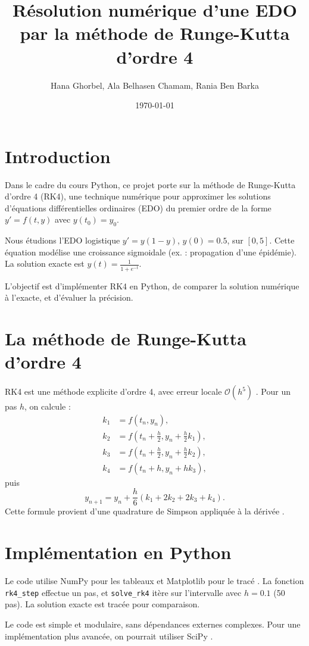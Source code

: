 \documentclass[12pt,a4paper]{article}
\title{Résolution numérique d'une EDO par la méthode de Runge-Kutta d'ordre 4}
\author{Hana Ghorbel, Ala Belhasen Chamam, Rania Ben Barka}
\date{\today}
\begin{document}
\maketitle

\section{Introduction}
Dans le cadre du cours Python, ce projet porte sur la méthode de Runge-Kutta d'ordre 4 (RK4), une technique numérique pour approximer les solutions d'équations différentielles ordinaires (EDO) du premier ordre de la forme $y' = f(t, y)$ avec $y(t_0) = y_0$.

Nous étudions l'EDO logistique $y' = y(1 - y)$, $y(0) = 0.5$, sur $[0, 5]$. Cette équation modélise une croissance sigmoidale (ex. : propagation d'une épidémie). La solution exacte est $y(t) = \frac{1}{1 + e^{-t}}$.

L'objectif est d'implémenter RK4 en Python, de comparer la solution numérique à l'exacte, et d'évaluer la précision.

\section{La méthode de Runge-Kutta d'ordre 4}
RK4 est une méthode explicite d'ordre 4, avec erreur locale $\mathcal{O}(h^5)$ \cite{butcher}. Pour un pas $h$, on calcule :
\begin{align*}
k_1 &= f(t_n, y_n), \\
k_2 &= f\left(t_n + \frac{h}{2}, y_n + \frac{h}{2} k_1\right), \\
k_3 &= f\left(t_n + \frac{h}{2}, y_n + \frac{h}{2} k_2\right), \\
k_4 &= f(t_n + h, y_n + h k_3),
\end{align*}
puis
\[
y_{n+1} = y_n + \frac{h}{6} (k_1 + 2k_2 + 2k_3 + k_4).
\]
Cette formule provient d'une quadrature de Simpson appliquée à la dérivée \cite{hairer}.

\section{Implémentation en Python}
Le code utilise NumPy pour les tableaux et Matplotlib pour le tracé \cite{numpy,matplotlib}. La fonction \texttt{rk4\_step} effectue un pas, et \texttt{solve\_rk4} itère sur l'intervalle avec $h = 0.1$ (50 pas). La solution exacte est tracée pour comparaison.

Le code est simple et modulaire, sans dépendances externes complexes. Pour une implémentation plus avancée, on pourrait utiliser SciPy \cite{scipy}.
\end{document}

